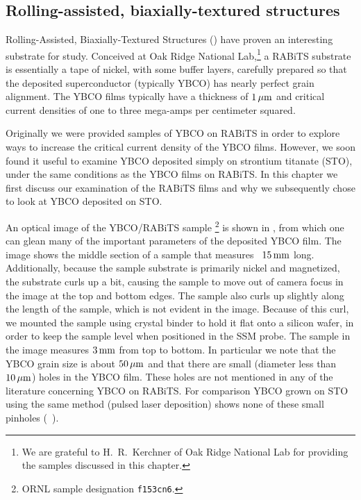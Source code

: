\subsection[Rolling-assisted, biaxially-textured structures]
{Rolling-assisted, biaxially-textured structures}

Rolling-Assisted, Biaxially-Textured Structures (\rabits)%
\cite{feldman_apl_77_2000,feldman_2000,rabits_web}
have proven an interesting substrate for study. Conceived at
Oak Ridge National Lab,\footnote{We are grateful to H.~R.~Kerchner
of Oak Ridge National Lab
for providing the samples discussed in this chapter.} a 
RABiTS substrate is essentially a tape of nickel, with some 
buffer layers, carefully prepared so that the deposited 
superconductor (typically YBCO) has nearly perfect grain alignment.
The YBCO films typically have a thickness of $1\,\mu\mathrm{m}$ and 
critical current densities of  one to three 
mega-amps per centimeter squared.

Originally we were provided samples of YBCO on RABiTS in order to
explore ways to increase the critical current density of the YBCO
films. However, we soon found it useful to examine YBCO deposited
simply on strontium titanate (STO), under the same conditions as the 
YBCO films on RABiTS.
In this chapter we first discuss our examination of the 
RABiTS films and why we subsequently chose to look at
YBCO deposited on STO. 

An optical image of the YBCO/RABiTS sample%
\footnote{ORNL sample designation \texttt{f153cn6}.}
is shown
in , from which one can glean many
of the important parameters of the deposited YBCO film. 
The image shows the middle section of a sample that measures \intoto\
$15\,\mathrm{mm}$ long. Additionally, because the sample substrate is primarily
nickel and magnetized, the substrate curls up a bit, causing the sample
to move out of camera focus in the image at the top and bottom edges. 
The sample also curls up slightly along the length of the sample, which
is not evident in the image. Because of this curl, we mounted the sample
using crystal binder to hold it flat onto a silicon wafer, in order 
to keep the sample level when positioned in the SSM probe. 
The sample in the image measures $3\,\mathrm{mm}$ from top to bottom.
In particular
we note that the YBCO grain size is about $50\,\mu\mathrm{m}$ and that there
are small (diameter less than $10\,\mu\mathrm{m}$) holes in the YBCO film. 
These holes are not mentioned in any of the literature concerning 
YBCO on RABiTS. For comparison YBCO grown on STO using the same
method (pulsed laser deposition) shows none of these small pinholes
(\cf\ \MultFigRef{fig:optical_rabits}{b}). 

